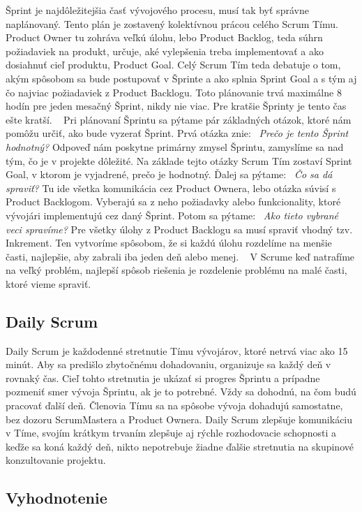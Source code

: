 \documentclass[10pt,slovak,a4paper]{article}
\begin{document}
Šprint je najdôležitejšia časť vývojového procesu, musí tak byť správne naplánovaný. Tento plán je zostavený kolektívnou prácou celého Scrum Tímu. Product Owner tu zohráva veľkú úlohu, lebo Product Backlog, teda súhrn požiadaviek na produkt, určuje, aké vylepšenia treba implementovať a ako dosiahnuť cieľ produktu, Product Goal. Celý Scrum Tím teda debatuje o tom, akým spôsobom sa bude postupovať v Šprinte a ako splnia Sprint Goal a s tým aj čo najviac požiadaviek z Product Backlogu. Toto plánovanie trvá maximálne 8 hodín pre jeden mesačný Šprint, nikdy nie viac. Pre kratšie Šprinty je tento čas ešte kratší. ~\cite{schwaber2020scrum}
Pri plánovaní Šprintu sa pýtame pár základných otázok, ktoré nám pomôžu určiť, ako bude vyzerať Šprint. Prvá otázka znie: ~\emph{Prečo je tento Šprint hodnotný?} Odpoveď nám poskytne primárny zmysel Šprintu, zamyslíme sa nad tým, čo je v projekte dôležité. Na základe tejto otázky Scrum Tím zostaví Sprint Goal, v ktorom je vyjadrené, prečo je hodnotný. Ďalej sa pýtame: ~\emph{Čo sa dá spraviť?} Tu ide všetka komunikácia cez Product Ownera, lebo otázka súvisí s Product Backlogom. Vyberajú sa z neho požiadavky alebo funkcionality, ktoré vývojári implementujú cez daný Šprint. Potom sa pýtame: ~\emph{Ako tieto vybrané veci spravíme?} Pre všetky úlohy z Product Backlogu sa musí spraviť vhodný tzv. Inkrement. Ten vytvoríme spôsobom, že si každú úlohu rozdelíme na menšie časti, najlepšie, aby zabrali iba jeden deň alebo menej. ~\cite{schwaber2020scrum} V Scrume keď natrafíme na veľký problém, najlepší spôsob riešenia je rozdelenie problému na malé časti, ktoré vieme spraviť.


\subsection{Daily Scrum}

Daily Scrum je každodenné stretnutie Tímu vývojárov, ktoré netrvá viac ako 15 minút. Aby sa predišlo zbytočnému dohadovaniu, organizuje sa každý deň v rovnaký čas. Cieľ tohto stretnutia je ukázať si progres Šprintu a prípadne pozmeniť smer vývoja Šprintu, ak je to potrebné. Vždy sa dohodnú, na čom budú pracovať ďalší deň. Členovia Tímu sa na spôsobe vývoja dohadujú samostatne, bez dozoru ScrumMastera a Product Ownera. Daily Scrum zlepšuje komunikáciu v Tíme, svojím krátkym trvaním zlepšuje aj rýchle rozhodovacie schopnosti a keďže sa koná každý deň, nikto nepotrebuje žiadne ďalšie stretnutia na skupinové konzultovanie projektu. ~\cite{schwaber2020scrum}

\subsection{Vyhodnotenie}
\end{document}
